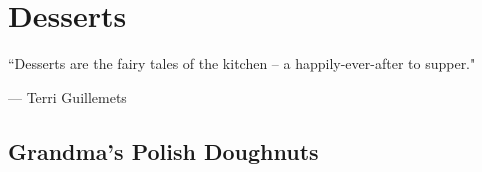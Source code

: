 \chapter{Desserts}
\label{desserts}
\epigraph{``Desserts are the fairy tales of the kitchen -- a happily-ever-after to supper."}{--- \textup{Terri Guillemets}}

\section{Grandma's Polish Doughnuts}
\label{grandmaspolishdoughnuts}
